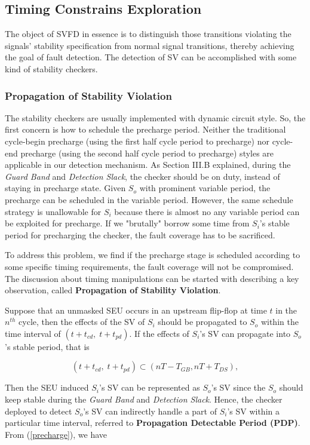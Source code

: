 \subsection{Timing Constrains Exploration}
The object of SVFD in essence is to distinguish those transitions violating the signals' stability specification from normal signal transitions, thereby achieving the goal of fault detection. The detection of SV can be accomplished with some kind of stability checkers.

\subsubsection{Propagation of Stability Violation}
The stability checkers are usually implemented with dynamic circuit style. So, the first concern is how to schedule the precharge period. Neither the traditional cycle-begin precharge (using the first half cycle period to precharge) nor cycle-end precharge (using the second half cycle period to precharge) styles are applicable in our detection mechanism. As Section III.B explained, during the \emph{Guard Band} and \emph{Detection Slack}, the checker should be on duty, instead of staying in precharge state. Given $S_o$ with prominent variable period, the precharge can be scheduled in the variable period. However, the same schedule strategy is unallowable for $S_i$ because there is almost no any variable period can be exploited for precharge. If we "brutally" borrow some time from $S_i$'s stable period for precharging the checker, the fault coverage has to be sacrificed.

To address this problem, we find if the precharge stage is scheduled according to some specific timing requirements, the fault coverage will not be compromised. The discussion about timing manipulations can be started with describing a key observation, called {\bf Propagation of Stability Violation}.

Suppose that an unmasked SEU occurs in an upstream flip-flop at time $t$ in the $n^{th}$ cycle, then the effects of the SV of $S_i$ should be propagated to $S_o$ within the time interval of $(t+t_{cd},\;t+t_{pd})$.  If the effects of $S_i$'s SV can propagate into $S_o$'s stable period, that is

\begin{equation}\label{precharge}
(t+t_{cd},\;t+t_{pd}) \subset (nT-T_{GB}, nT+T_{DS}), 
\end{equation} 

Then the SEU induced $S_i$'s SV can be represented as $S_o$'s SV since the $S_o$ should keep stable during the \emph{Guard Band} and \emph{Detection Slack}. Hence, the checker deployed to detect $S_o$'s SV can indirectly handle a part of $S_i$'s SV within a particular time interval, referred to {\bf Propagation Detectable Period (PDP)}. From (\ref{precharge}), we have

